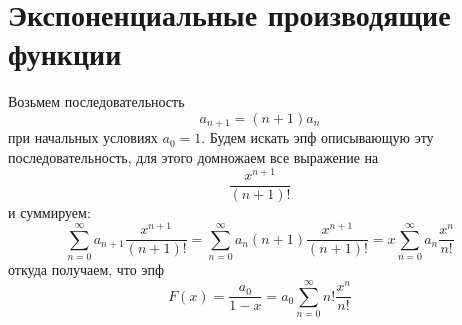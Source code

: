 \section{Экспоненциальные производящие функции}

Возьмем последовательность $$ a_{n+1} = \left(n+1\right) a_n$$ при начальных условиях $a_0 = 1$.
Будем искать эпф описывающую эту последовательность, для этого домножаем все выражение на $$ \frac{x^{n+1}}{\left(n+1\right)!} $$ и суммируем: $$ \sum_{n=0}^{\infty} a_{n+1} \frac{x^{n+1}}{\left(n+1\right)!} = \sum_{n=0}^{\infty} a_n\left(n+1\right) \frac{x^{n+1}}{\left(n+1\right)!} = x\sum_{n=0}^{\infty} a_n \frac{x^n}{n!} $$
откуда получаем, что эпф $$ F\left(x\right) = \frac{a_0}{1 - x} = a_0 \sum_{n=0}^{\infty} n! \frac{x^n}{n!}$$
